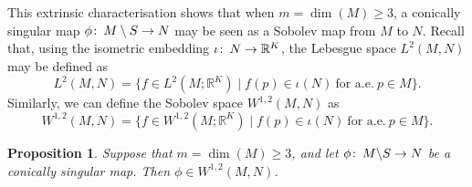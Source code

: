\documentclass{article}
\numberwithin{equation}{section}        %
\theoremstyle{bfnote}
\newtheorem{prop}[thm]{Proposition}         %
\theoremstyle{definition}
\theoremstyle{bfremark}
\newcommand{\col}{\colon \thinspace}        %
\newcommand{\R}{\mathbb{R}}                 %
\begin{document}
This extrinsic characterisation shows that when $m = \dim(M) \geq 3$, a conically singular map $\phi \col M \setminus S \to N$ may be seen as a Sobolev map from $M$ to $N$. Recall that, using the isometric embedding $\iota \col N \rightarrow \R^K$, the Lebesgue space $L^2(M,N)$ may be defined as
\begin{equation*}
    L^2(M,N) = \{ f \in L^2(M;\R^K) \mid f(p) \in \iota(N) ~ \text{for a.e.} ~ p \in M \} .
\end{equation*}
Similarly, we can define the Sobolev space $W^{1,2}(M,N)$ as
\begin{equation*}
    W^{1,2}(M,N) = \{ f \in W^{1,2}(M;\R^K) \mid f(p) \in \iota(N) ~ \text{for a.e.} ~ p \in M \} .
\end{equation*}

\begin{prop}
    Suppose that $m = \dim(M) \geq 3$, and let $\phi \col M \backslash S \rightarrow N$ be a conically singular map. Then $\phi \in W^{1,2}(M,N)$. 
\end{prop}
\end{document}
